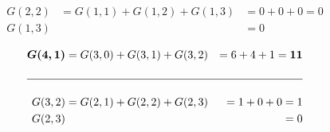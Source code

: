 \documentclass{article}
\begin{document}
{\begin{equation*}
\begin{aligned}
            G(2,2)  &=  G(1,1)+G(1,2)+G(1,3)        &=0+0+0=0\\
            G(1,3)  &&= 0\\
        \end{aligned}
    \end{equation*}
    \begin{equation*}
        \begin{aligned}
            \boldsymbol{G(4,1)} &=  G(3,0)+G(3,1)+G(3,2)       &=6+4+1=\boldsymbol{11}\\
            \\\hline\\
            G(3,2)  &=  G(2,1)+G(2,2)+G(2,3)                    &=1+0+0=1\\
            G(2,3)  &&= 0\\
        \end{aligned}
    \end{equation*}
    }
\end{document}
